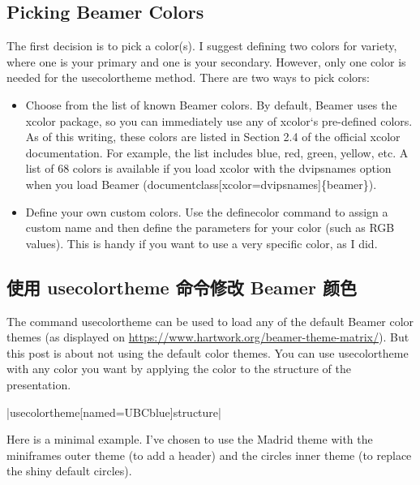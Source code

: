 \begin{column}{0.5\textwidth}
\subsection{Picking Beamer Colors}

The first decision is to pick a color(s). I suggest defining two colors for variety, where one is your primary and one is your secondary. However, only one color is needed for the {\ttfamily usecolortheme} method. There are two ways to pick colors:

\begin{itemize}
  \item Choose from the list of known Beamer colors. By default, Beamer uses the xcolor package, so you can immediately use any of xcolor‘s pre-defined colors. As of this writing, these colors are listed in Section 2.4 of the official xcolor documentation. For example, the list includes blue, red, green, yellow, etc. A list of 68 colors is available if you load xcolor with the {\ttfamily dvipsnames} option when you load Beamer ({\ttfamily documentclass[xcolor=dvipsnames]\{beamer\}}).
  \item Define your own custom colors. Use the {\ttfamily definecolor} command to assign a custom name and then define the parameters for your color (such as RGB values). This is handy if you want to use a very specific color, as I did.
\end{itemize}

\subsection{使用 {\ttfamily usecolortheme} 命令修改 Beamer 颜色}

The command {\ttfamily usecolortheme} can be used to load any of the default Beamer color themes (as displayed on \url{https://www.hartwork.org/beamer-theme-matrix/}). 
But this post is about not using the default color themes. You can use {\ttfamily usecolortheme} with any color you want by applying the color to the {\ttfamily structure} of the presentation.

|{\ttfamily usecolortheme}[named=UBCblue]{structure}|

Here is a minimal example. I’ve chosen to use the Madrid theme with the {\ttfamily miniframes} outer theme (to add a header) and the {\ttfamily circles} inner theme (to replace the shiny default circles).

\inputminted[linenos=true]{latex}{examples/beamer/color-usecolortheme.tex}


\end{column}
